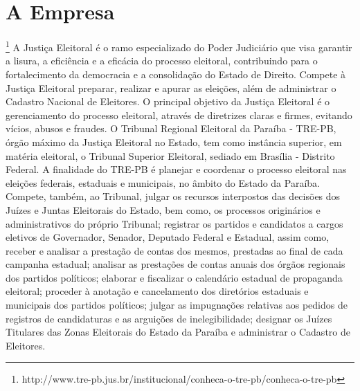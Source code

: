 
\section{A Empresa}\footnote{http://www.tre-pb.jus.br/institucional/conheca-o-tre-pb/conheca-o-tre-pb}
\label{sec:empresa}
A Justiça Eleitoral é o ramo especializado do Poder Judiciário que visa garantir a lisura, a eficiência e a eficácia do processo eleitoral, contribuindo para o fortalecimento da democracia e a consolidação do Estado de Direito. Compete à Justiça Eleitoral preparar, realizar e apurar as eleições, além de administrar o Cadastro Nacional de Eleitores.
O principal objetivo da Justiça Eleitoral é o gerenciamento do processo eleitoral, através de diretrizes claras e firmes, evitando vícios, abusos e fraudes.
O Tribunal Regional Eleitoral da Paraíba - TRE-PB, órgão máximo da Justiça Eleitoral no Estado, tem como instância superior, em matéria eleitoral, o Tribunal Superior Eleitoral, sediado em Brasília - Distrito Federal. A finalidade do TRE-PB é planejar e coordenar o processo eleitoral nas eleições federais, estaduais e municipais, no âmbito do Estado da Paraíba.
Compete, também, ao Tribunal, julgar os recursos interpostos das decisões dos Juízes e Juntas Eleitorais do Estado, bem como, os processos originários e administrativos do próprio Tribunal; registrar os partidos e candidatos a cargos eletivos de Governador, Senador, Deputado Federal e Estadual, assim como, receber e analisar a prestação de contas dos mesmos, prestadas ao final de cada campanha estadual; analisar as prestações de contas anuais dos órgãos regionais dos partidos políticos; elaborar e fiscalizar o calendário estadual de propaganda eleitoral; proceder à anotação e cancelamento dos diretórios estaduais e municipais dos partidos políticos; julgar as impugnações relativas aos pedidos de registros de candidaturas e as arguições de inelegibilidade; designar os Juízes Titulares das Zonas Eleitorais do Estado da Paraíba e administrar o Cadastro de Eleitores.

